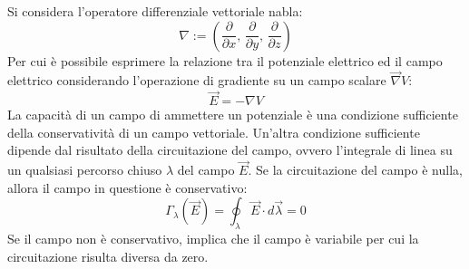 \documentclass{article}
\numberwithin{equation}{subsection}
\begin{document}
Si considera l'operatore differenziale vettoriale nabla: 
\begin{equation*}
    {\nabla}:=\left(\displaystyle\frac{\partial}{\partial x},\,\frac{\partial}{\partial y},\,\frac{\partial}{\partial z}\right)
\end{equation*}
Per cui è possibile esprimere la relazione tra il potenziale elettrico ed il campo elettrico considerando l'operazione di gradiente su un campo scalare $\vec{\nabla}V$: 
\begin{equation}
    \vec{E}=-{\nabla}V
\end{equation}
La capacità di un campo di ammettere un potenziale è una condizione sufficiente della conservatività di un campo vettoriale. Un'altra condizione sufficiente dipende dal 
risultato della circuitazione del campo, ovvero l'integrale di linea su un qualsiasi percorso chiuso $\lambda$ del campo $\vec{E}$. Se la circuitazione del campo è nulla, 
allora il campo in questione è conservativo:
\begin{equation}
    \Gamma_\lambda(\vec{E})=\displaystyle\oint_{\lambda}\vec{E}\cdot d\vec{\lambda}=0
\end{equation}
Se il campo non è conservativo, implica che il campo è variabile per cui la circuitazione risulta diversa da zero. 
\end{document}
